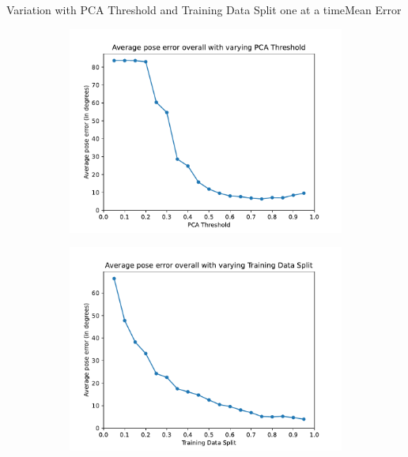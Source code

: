 \documentclass[aspectratio=169, handout, 10pt, hyperref=colorlinks]{beamer}
\begin{document}
\begin{frame}{Variation with PCA Threshold and Training Data Split one at a time}{Mean Error}
    \begin{figure}
        \centering
        \begin{subfigure}{0.48\linewidth}
            \centering
            \includegraphics[width=\linewidth]{pca/mean_error_overall.pdf}
        \end{subfigure}
        \begin{subfigure}{0.48\linewidth}
            \centering
            \includegraphics[width=\linewidth]{tds/mean_error_overall.pdf}
        \end{subfigure}
    \end{figure}
\end{frame}
\end{document}
